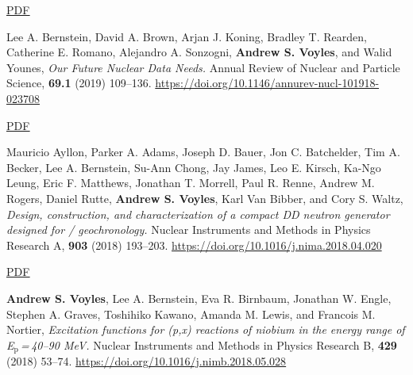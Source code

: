 \begin{bibsection}
\ifshort \vspace{0.1cm} \href{https://avoyles.github.io/papers/Morrell2020_LaCe.pdf}{\underline{PDF}} \else  \fi 


\item Lee A. Bernstein,  David A. Brown,  Arjan J. Koning, Bradley T. Rearden,  Catherine E. Romano, Alejandro A. Sonzogni,  \textbf{Andrew S. Voyles}, and Walid Younes, \emph{Our Future Nuclear Data Needs.} Annual Review of Nuclear and Particle Science, \textbf{69.1} (2019) 109--136.
 \url{https://doi.org/10.1146/annurev-nucl-101918-023708}


\ifshort \vspace{0.1cm} \href{https://avoyles.github.io/papers/Bernstein2019_NuclearData.pdf}{\underline{PDF}} \else  \fi 


\item Mauricio Ayllon, Parker A. Adams, Joseph D. Bauer, Jon C. Batchelder, Tim A. Becker, Lee A. Bernstein, Su-Ann Chong, Jay James, Leo E. Kirsch, Ka-Ngo Leung, Eric F. Matthews, Jonathan T. Morrell, Paul R. Renne, Andrew M. Rogers, Daniel Rutte, \textbf{Andrew S. Voyles}, Karl Van Bibber, and Cory S. Waltz, \emph{Design, construction, and characterization of a compact DD neutron generator designed for / geochronology.} Nuclear Instruments and Methods in Physics Research  A,
\textbf{903} (2018) 193--203. \url{https://doi.org/10.1016/j.nima.2018.04.020}

\ifshort \vspace{0.1cm} \href{https://avoyles.github.io/papers/Ayllon2018_geochronology.pdf}{\underline{PDF}} \else  \fi

\item \textbf{Andrew S. Voyles}, Lee A. Bernstein, Eva R. Birnbaum, Jonathan W. Engle, Stephen A. Graves, Toshihiko Kawano, Amanda M. Lewis, and Francois M. Nortier, \emph{Excitation functions for (p,x) reactions of niobium in the energy range of  E$_{\text{p}}$\,=\,40--90 MeV.} Nuclear Instruments and Methods in Physics Research  B,
\textbf{429} (2018) 53--74. \url{https://doi.org/10.1016/j.nimb.2018.05.028}




\end{bibsection}
